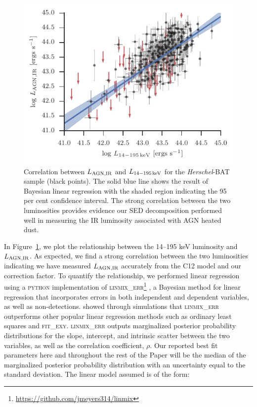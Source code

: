 \documentclass[fleqn, usenatbib]{mnras}
\newcommand{\herschel}{\emph{Herschel}}
\begin{document}
\begin{figure}
\includegraphics{figures/lagnIR_lbat_correlation}
\caption{Correlation between $L_{\rm AGN, IR}$ and $L_{\rm 14-195\,keV}$ for the \herschel-BAT sample (black points). The solid blue line shows the result of Bayesian linear regression with the shaded region indicating the 95 per cent confidence interval. The strong correlation between the two luminosities provides evidence our SED decomposition performed well in measuring the IR luminosity associated with AGN heated dust.\label{fig:lagnIR_lbat}}
\end{figure}

In Figure~\ref{fig:lagnIR_lbat}, we plot the relationship between the 14--195 keV luminosity and $L_{\rm AGN,IR}$. As expected, we find a strong correlation between the two luminosities indicating we have measured $L_{\rm AGN,IR}$ accurately from the C12 model and our correction factor. To quantify the relationship, we performed linear regression using a \textsc{python} implementation of \textsc{linmix\_err}\footnote{\url{https://github.com/jmeyers314/linmix}} \citep{Kelly:2007lr}, a Bayesian method for linear regression that incorporates errors in both independent and dependent variables, as well as non-detections. \citet{Kelly:2007lr} showed through simulations that \textsc{linmix\_err} outperforms other popular linear regression methods such as ordinary least squares and \textsc{fit\_exy}. \textsc{linmix\_err} outputs marginalized posterior probability distributions for the slope, intercept, and intrinsic scatter between the two variables, as well as the correlation coefficient, $\rho$. Our reported best fit parameters here and throughout the rest of the Paper will be the median of the marginalized posterior probability distribution with an uncertainty equal to the standard deviation. The linear model assumed is of the form:
\end{document}
